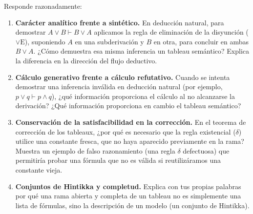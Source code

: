 \begin{pregunta}\label{e6-9}
Responde razonadamente:
\begin{enumerate}
    \item \textbf{Carácter analítico frente a sintético.} En deducción natural, para demostrar $A \lor B \vdash B \lor A$ aplicamos la regla de eliminación de la disyunción ($\lor\text{E}$), suponiendo $A$ en una subderivación y $B$ en otra, para concluir en ambas $B \lor A$. ¿Cómo demuestra esa misma inferencia un tableau semántico? Explica la diferencia en la dirección del flujo deductivo.
    \item \textbf{Cálculo generativo frente a cálculo refutativo.} Cuando se intenta demostrar una inferencia inválida en deducción natural (por ejemplo, $p \lor q \vdash p \land q$), ¿qué información proporciona el cálculo al no alcanzarse la derivación? ¿Qué información proporciona en cambio el tableau semántico?
    \item \textbf{Conservación de la satisfacibilidad en la corrección\ampliacion.} En el teorema de corrección de los tableaux, ¿por qué es necesario que la regla existencial ($\delta$) utilice una constante fresca, que no haya aparecido previamente en la rama? Muestra un ejemplo de falso razonamiento (una regla $\delta$ defectuosa) que permitiría probar una fórmula que no es válida si reutilizáramos una constante vieja.
    \item \textbf{Conjuntos de Hintikka y completud\ampliacion.} Explica con tus
      propias palabras por qué una rama abierta y completa de un
      tableau no es simplemente una lista de fórmulas, sino la
      descripción de un modelo (un conjunto de Hintikka). 
\end{enumerate}
\end{pregunta}

